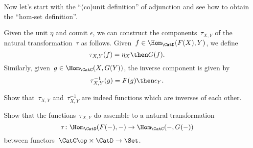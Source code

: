 Now let's start with the ``(co)unit definition'' of adjunction and see how to obtain the ``hom-set definition''.

Given the unit $\eta$ and counit $\epsilon$, we can construct the components~$\tau_{X,Y}$ of the natural transformation~$\tau$ as follows. Given~$f \in \Hom_{\CatD}(F(X),Y)$, we define
\begin{equation*}
  \tau_{X,Y}(f) = \eta_X \then G(f).
\end{equation*}
Similarly, given~$g \in \Hom_{\CatC}(X,G(Y))$, the inverse component is given by
\begin{equation*}
  \tau_{X,Y}^{-1}(g) = F(g) \then \epsilon_Y.
\end{equation*}

\begin{exercise}\label{ex:tau}
  Show that~$\tau_{X,Y}$ and~$\tau_{X,Y}^{-1}$ are indeed functions which are inverses of each other.
\end{exercise}
\begin{solution}
\end{solution}

\begin{exercise}\label{ex:tau2}
  Show that the functions~$\tau_{X,Y}$ do assemble to a natural transformation
  \begin{equation*}
    \tau  \colon \Hom_{\CatD}(F(-) ,- ) \to \Hom_{\CatC}(-  , G(- ) )
  \end{equation*}
  between functors~$\CatC\op \times \CatD \to \Set $.
\end{exercise}
\begin{solution}
\end{solution}
